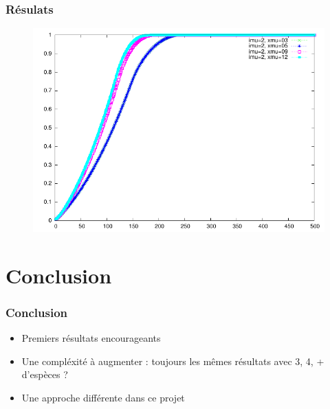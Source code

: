\documentclass[handout]{beamer}
\begin{document}
\begin{frame}
	\frametitle{Résulats}
\begin{figure}[!h]
\centering
	\includegraphics[scale=0.75]{img/plot2-2.pdf}
\end{figure}
\end{frame}

\section*{Conclusion}

\begin{frame}
	\frametitle{Conclusion}
\begin{itemize}
	\item Premiers résultats encourageants
	\item Une compléxité à augmenter : toujours les mêmes résultats avec 3, 4, + d'espèces ?
	\item Une approche différente dans ce projet
\end{itemize}
\end{frame}
\end{document}
